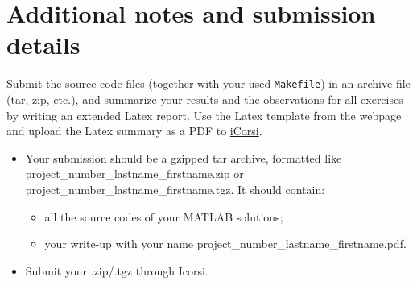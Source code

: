 \documentclass[unicode,11pt,a4paper,oneside,numbers=endperiod,openany]{scrartcl}
\begin{document}







\section*{Additional notes and submission details}
Submit the source code files (together with your used \texttt{Makefile}) in
an archive file (tar, zip, etc.), and summarize your results and the
observations for all exercises by writing an extended Latex report.
Use the Latex template from the webpage and upload the Latex summary
as a PDF to \href{https://www.icorsi.ch}{iCorsi}.

\begin{itemize}
	\item Your submission should be a gzipped tar archive, formatted like project\_number\_lastname\_firstname.zip or project\_number\_lastname\_firstname.tgz. 
	It should contain:
	\begin{itemize}
		\item all the source codes of your MATLAB solutions;
		\item your write-up with your name  project\_number\_lastname\_firstname.pdf.
	\end{itemize}
	\item Submit your .zip/.tgz through Icorsi.
\end{itemize}
\end{document}
